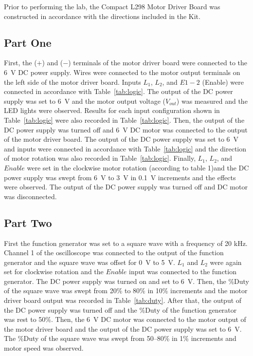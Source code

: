Prior to performing the lab, the Compact L298 Motor Driver Board was constructed in accordance with the directions included in the Kit.

\subsection{Part One}
\label{sec:part_one}

First, the ($+$) and ($-$) terminals of the motor driver board were connected to the \SI{6}{V} DC power supply.  Wires were connected to the motor output terminals on the left side of the motor driver board.  Inputs $L_1$, $L_2$, and $E1-2$ (Enable) were connected in accordance with Table~\ref{tab:logic}.  The output of the DC power supply was set to \SI{6}{V} and the motor output voltage ($V_{out}$) was measured and the LED lights were observed.  Results for each input configuration shown in Table~\ref{tab:logic} were also recorded in Table~\ref{tab:logic}.  Then, the output of the DC power supply was turned off and \SI{6}{V} DC motor was connected to the output of the motor driver board.  The output of the DC power supply was set to \SI{6}{V} and inputs were connected in accordance with Table~\ref{tab:logic} and the direction of motor rotation was also recorded in Table~\ref{tab:logic}.  Finally, $L_1$, $L_2$, and $Enable$ were set in the clockwise motor rotation (according to table 1)and the DC power supply was swept from \SI{6}{V} to \SI{3}{V} in \SI{0.1}{V} increments and the effects were observed.  The output of the DC power supply was turned off and DC motor was disconnected.

\subsection{Part Two}
\label{sec:part_two}

First the function generator was set to a square wave with a frequency of 20 kHz.  Channel 1 of the oscilloscope was connected to the output of the function generator and the square wave was offset for \SI{0}{V} to \SI{5}{V}.  $L_1$ and $L_2$ were again set for clockwise rotation and the $Enable$ input was connected to the function generator.  The DC power supply was turned on and set to \SI{6}{V}.  Then, the \%Duty of the square wave was swept from 20\% to 80\% in 10\% increments and the motor driver board output was recorded in Table~\ref{tab:duty}.  After that, the output of the DC power supply was turned off and the \%Duty of the function generator was rest to 50\%.  Then, the \SI{6}{V} DC motor was connected to the motor output of the motor driver board and the output of the DC power supply was set to \SI{6}{V}.  The \%Duty of the square wave was swept from 50--80\% in 1\% increments and motor speed was observed.

